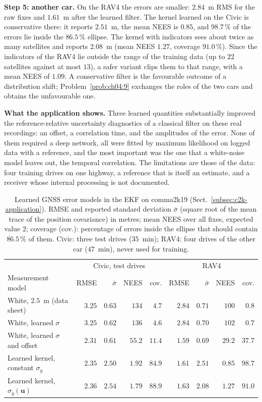 \textbf{Step 5: another car.} On the RAV4 the errors are smaller: $2.84$~m RMS for the raw fixes and $1.61$~m after the learned filter. The kernel learned on the Civic is conservative there: it reports $2.51$~m, the mean NEES is $0.85$, and $98.7\,\%$ of the errors lie inside the $86.5\,\%$ ellipse. The kernel with indicators sees about twice as many satellites and reports $2.08$~m (mean NEES $1.27$, coverage $91.0\,\%$). Since the indicators of the RAV4 lie outside the range of the training data (up to $22$ satellites against at most $13$), a safer variant clips them to that range, with a mean NEES of $1.09$. A conservative filter is the favourable outcome of a distribution shift; Problem~\ref{prob:ch04:9} exchanges the roles of the two cars and obtains the unfavourable one.

\textbf{What the application shows.} Three learned quantities substantially improved the reference-relative uncertainty diagnostics of a classical filter on these real recordings: an offset, a correlation time, and the amplitudes of the error. None of them required a deep network, all were fitted by maximum likelihood on logged data with a reference, and the most important was the one that a white-noise model leaves out, the temporal correlation. The limitations are those of the data: four training drives on one highway, a reference that is itself an estimate, and a receiver whose internal processing is not documented.

\begin{table}[!t]
\centering
\footnotesize
\setlength{\tabcolsep}{3.5pt}
\caption{Learned GNSS error models in the EKF on comma2k19 (Sect.~\ref{subsec:c2k-application}). RMSE and reported standard deviation $\bar\sigma$ (square root of the mean trace of the position covariance) in metres; mean NEES over all fixes, expected value $2$; coverage (cov.): percentage of errors inside the ellipse that should contain $86.5\,\%$ of them. Civic: three test drives ($35$~min); RAV4: four drives of the other car ($47$~min), never used for training.}
\label{tab:c2k-results}
\begin{tabular}{lrrrrrrrr}
\hline
 & \multicolumn{4}{c}{Civic, test drives} & \multicolumn{4}{c}{RAV4} \\
Measurement model & RMSE & $\bar\sigma$ & NEES & cov. & RMSE & $\bar\sigma$ & NEES & cov. \\
\hline
White, $2.5$~m (data sheet) & $3.25$ & $0.63$ & $134$ & $4.7$ & $2.84$ & $0.71$ & $100$ & $0.8$ \\
White, learned $\sigma$ & $3.25$ & $0.62$ & $136$ & $4.6$ & $2.84$ & $0.70$ & $102$ & $0.7$ \\
White, learned $\sigma$ and offset & $2.31$ & $0.61$ & $55.2$ & $11.4$ & $1.59$ & $0.69$ & $29.2$ & $37.7$ \\
Learned kernel, constant $\sigma_g$ & $2.35$ & $2.50$ & $1.92$ & $84.9$ & $1.61$ & $2.51$ & $0.85$ & $98.7$ \\
Learned kernel, $\sigma_g(\mathbf{u})$ & $2.36$ & $2.54$ & $1.79$ & $88.9$ & $1.63$ & $2.08$ & $1.27$ & $91.0$ \\
\hline
\end{tabular}
\end{table}

